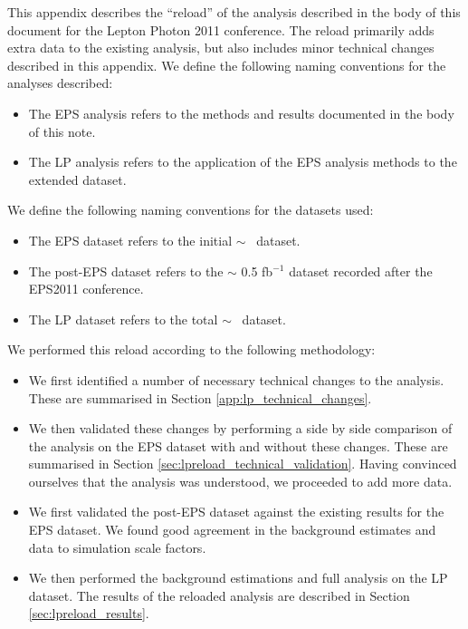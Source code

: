 
This appendix describes the ``reload'' of the analysis described in the body
of this document for the Lepton Photon 2011 conference.
The reload primarily adds extra data to the existing analysis, but also 
includes minor technical changes described in this appendix.
We define the following naming conventions for the analyses described:

\begin{itemize}
    \item The EPS analysis refers to the methods and results documented in the body of this note.
    \item The LP analysis refers to the application of the EPS analysis methods to the extended dataset.
\end{itemize}

We define the following naming conventions for the datasets used:

\begin{itemize}
    \item The EPS dataset refers to the initial $\sim$ \intlumi~dataset.
    \item The post-EPS dataset refers to the $\sim$ 0.5 fb$^{-1}$ dataset recorded after the EPS2011 conference.
    \item The LP dataset refers to the total $\sim$ \lpintlumi~dataset.
\end{itemize}

We performed this reload according to the following methodology:

\begin{itemize}
    \item We first identified a number of necessary technical changes to the analysis.  
These are summarised in Section \ref{app:lp_technical_changes}.
    \item We then validated these changes by performing a side by side comparison of 
the analysis on the EPS dataset with and without these changes.
These are summarised in Section \ref{sec:lpreload_technical_validation}.
Having convinced ourselves that the analysis was understood, we proceeded to add more data.
    \item We first validated the post-EPS dataset against the existing results for the EPS dataset.
We found good agreement in the background estimates and data to simulation scale factors.
    \item We then performed the background estimations and full analysis on the LP dataset.
The results of the reloaded analysis are described in Section \ref{sec:lpreload_results}.
\end{itemize}

